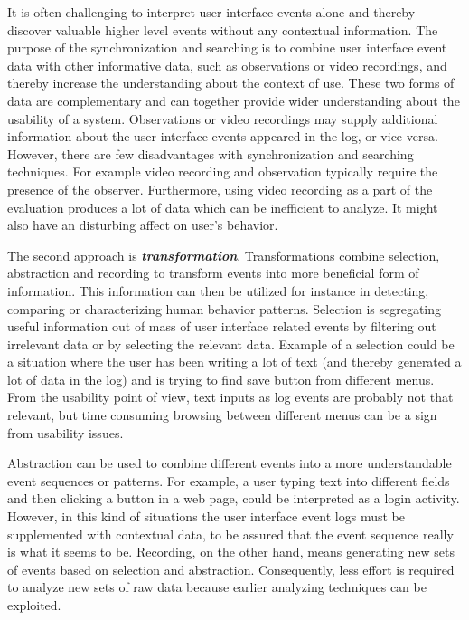 \documentclass[12pt,a4paper,oneside,pdftex]{report}
\begin{document}
It is often challenging to interpret user interface events alone and thereby discover valuable higher level events without any contextual information. The purpose of the synchronization and searching is to combine user interface event data with other informative data, such as observations or video recordings, and thereby increase the understanding about the context of use. These two forms of data are complementary and can together provide wider understanding about the usability of a system. Observations or video recordings may supply additional information about the user interface events appeared in the log, or vice versa. However, there are few disadvantages with synchronization and searching techniques. For example video recording and observation typically require the presence of the observer. Furthermore, using video recording as a part of the evaluation produces a lot of data which can be inefficient to analyze. It might also have an disturbing affect on user's behavior. \cite{RefWorks:25}

The second approach is \textbf{\emph{transformation}}. Transformations combine selection, abstraction and recording to transform events into more beneficial form of information. This information can then be utilized for instance in detecting, comparing or characterizing human behavior patterns. Selection is segregating useful information out of mass of user interface related events by filtering out irrelevant data or by selecting the relevant data. Example of a selection could be a situation where the user has been writing a lot of text (and thereby generated a lot of data in the log) and is trying to find save button from different menus. From the usability point of view, text inputs as log events are probably not that relevant, but time consuming browsing between different menus can be a sign from usability issues. \cite{RefWorks:25}

Abstraction can be used to combine different events into a more understandable event sequences or patterns. For example, a user typing text into different fields and then clicking a button in a web page, could be interpreted as a login activity. However, in this kind of situations the user interface event logs must be supplemented with contextual data, to be assured that the event sequence really is what it seems to be. Recording, on the other hand, means generating new sets of events based on selection and abstraction. Consequently, less effort is required to analyze new sets of raw data because earlier analyzing techniques can be exploited. \cite{RefWorks:25}
\end{document}
